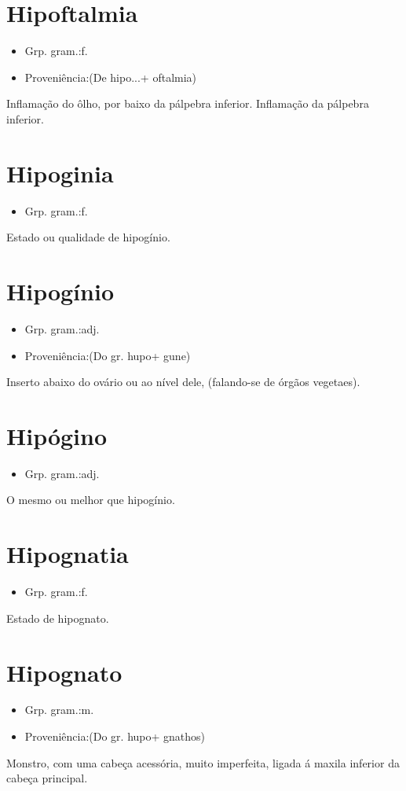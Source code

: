 \documentclass{article}
\begin{document}
\section{Hipoftalmia}
\begin{itemize}
\item {Grp. gram.:f.}
\end{itemize}
\begin{itemize}
\item {Proveniência:(De \textunderscore hipo...\textunderscore  + \textunderscore oftalmia\textunderscore )}
\end{itemize}
Inflamação do ôlho, por baixo da pálpebra inferior.
Inflamação da pálpebra inferior.
\section{Hipoginia}
\begin{itemize}
\item {Grp. gram.:f.}
\end{itemize}
Estado ou qualidade de hipogínio.
\section{Hipogínio}
\begin{itemize}
\item {Grp. gram.:adj.}
\end{itemize}
\begin{itemize}
\item {Proveniência:(Do gr. \textunderscore hupo\textunderscore  + \textunderscore gune\textunderscore )}
\end{itemize}
Inserto abaixo do ovário ou ao nível dele, (falando-se de órgãos vegetaes).
\section{Hipógino}
\begin{itemize}
\item {Grp. gram.:adj.}
\end{itemize}
O mesmo ou melhor que \textunderscore hipogínio\textunderscore .
\section{Hipognatia}
\begin{itemize}
\item {Grp. gram.:f.}
\end{itemize}
Estado de hipognato.
\section{Hipognato}
\begin{itemize}
\item {Grp. gram.:m.}
\end{itemize}
\begin{itemize}
\item {Proveniência:(Do gr. \textunderscore hupo\textunderscore  + \textunderscore gnathos\textunderscore )}
\end{itemize}
Monstro, com uma cabeça acessória, muito imperfeita, ligada á maxila inferior da cabeça principal.
\end{document}
